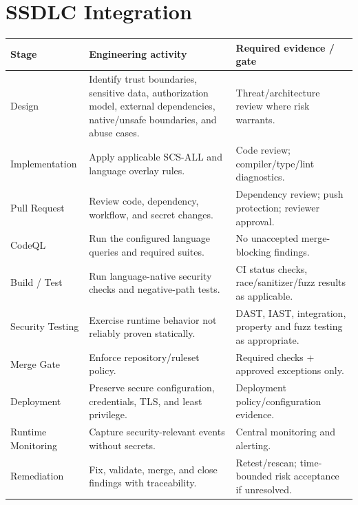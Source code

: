 \documentclass[10pt,letterpaper]{article}
\begin{document}
\section{SSDLC Integration}
\small
\begin{tabularx}{\textwidth}{@{}P{1.12in}Y P{2.15in}@{}}
\toprule
\textbf{Stage} & \textbf{Engineering activity} & \textbf{Required evidence / gate}\\
\midrule
Design & Identify trust boundaries, sensitive data, authorization model, external dependencies, native/unsafe boundaries, and abuse cases. & Threat/architecture review where risk warrants.\\
Implementation & Apply applicable SCS-ALL and language overlay rules. & Code review; compiler/type/lint diagnostics.\\
Pull Request & Review code, dependency, workflow, and secret changes. & Dependency review; push protection; reviewer approval.\\
CodeQL & Run the configured language queries and required suites. & No unaccepted merge-blocking findings.\\
Build / Test & Run language-native security checks and negative-path tests. & CI status checks, race/sanitizer/fuzz results as applicable.\\
Security Testing & Exercise runtime behavior not reliably proven statically. & DAST, IAST, integration, property and fuzz testing as appropriate.\\
Merge Gate & Enforce repository/ruleset policy. & Required checks + approved exceptions only.\\
Deployment & Preserve secure configuration, credentials, TLS, and least privilege. & Deployment policy/configuration evidence.\\
Runtime Monitoring & Capture security-relevant events without secrets. & Central monitoring and alerting.\\
Remediation & Fix, validate, merge, and close findings with traceability. & Retest/rescan; time-bounded risk acceptance if unresolved.\\
\bottomrule
\end{tabularx}
\normalsize
\end{document}
